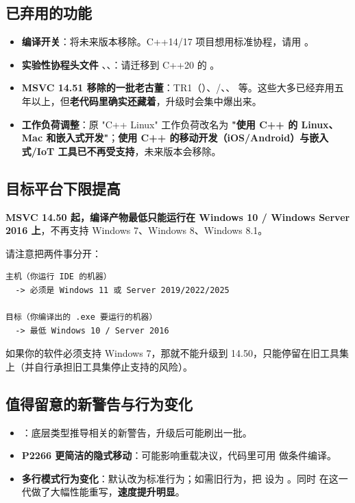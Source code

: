 \subsection{已弃用的功能}
\begin{itemize}
  \item \textbf{ 编译开关}：将未来版本移除。C++14/17 项目想用标准协程，请用 。
  \item \textbf{实验性协程头文件} 、、：请迁移到 C++20 的 。
  \item \textbf{MSVC 14.51 移除的一批老古董}：TR1（）、/、、 等。这些大多已经弃用五年以上，但\textbf{老代码里确实还藏着}，升级时会集中爆出来。
  \item \textbf{工作负荷调整}：原 "C++ Linux" 工作负荷改名为 \textbf{"使用 C++ 的 Linux、Mac 和嵌入式开发"}；\textbf{使用 C++ 的移动开发（iOS/Android）与嵌入式/IoT 工具已不再受支持}，未来版本会移除。
\end{itemize}

\subsection{目标平台下限提高}
\textbf{MSVC 14.50 起，编译产物最低只能运行在 Windows 10 / Windows Server 2016 上}，不再支持 Windows 7、Windows 8、Windows 8.1。

请注意把两件事分开：

\begin{lstlisting}[style=textstyle]
主机（你运行 IDE 的机器）
  -> 必须是 Windows 11 或 Server 2019/2022/2025

目标（你编译出的 .exe 要运行的机器）
  -> 最低 Windows 10 / Server 2016
\end{lstlisting}

如果你的软件必须支持 Windows 7，那就不能升级到 14.50，只能停留在旧工具集上（并自行承担旧工具集停止支持的风险）。

\subsection{值得留意的新警告与行为变化}
\begin{itemize}
  \item \textbf{}：底层类型推导相关的新警告，升级后可能刷出一批。
  \item \textbf{P2266 更简洁的隐式移动}：可能影响重载决议，代码里可用  做条件编译。
  \item \textbf{ 多行模式行为变化}：默认改为标准行为；如需旧行为，把 \allowbreak{} 设为 。同时  在这一代做了大幅性能重写，\textbf{速度提升明显}。
\end{itemize}

